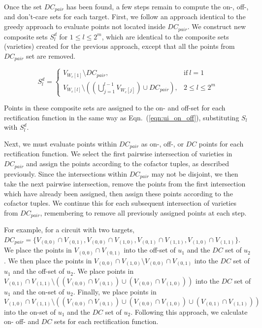 Once the set $DC_{pair}$ has been found, a few steps remain to compute the on-, off-, and don't-care sets for each target. First, we follow an approach identical to the greedy approach to evaluate points not located inside $DC_{pair}$. We construct new composite sets $S_l^d$ for $1 \leq l \leq 2^m$, which are identical to the composite sets (varieties) created for the previous approach, except that all the points from $DC_{pair}$ set are removed.

\begin{equation}
  \label{eqn:composite_dc}
  S_l^d=
  \begin{cases}
    V_{W_c[1]} \setminus DC_{pair},                                                & \text{if}\ l=1   \\
    V_{W_c[l]} \setminus ((\bigcup\limits_{j=1}^{l-1}V_{W_c[j]}) \cup DC_{pair}), & 2\leq l \leq 2^m
  \end{cases}
\end{equation}

Points in these composite sets are assigned to the on- and off-set for each rectification function in the same way as 
Eqn.~(\ref{eqn:ui_on_off}), substituting $S_l$ with $S_l^d$.

Next, we must evaluate points within $DC_{pair}$ as on-, off-, or $DC$ points for each rectification function. We select the first pairwise intersection of varieties in $DC_{pair}$ and assign the points according to the cofactor tuples, as described previously. Since the intersections within $DC_{pair}$ may not be disjoint, we then take the next pairwise intersection, remove the points from the first intersection which have already been assigned, then assign these points according to the cofactor tuples. We continue this for each subsequent intersection of varieties from $DC_{pair}$, remembering to remove all previously assigned points at each step.

For example, for a circuit with two targets, $DC_{pair} = \{V_{(0,0)} \cap V_{(0,1)}, V_{(0,0)} \cap V_{(1,0)}, V_{(0,1)} \cap V_{(1,1)}, V_{(1,0)} \cap V_{(1,1)}\}$. We place the points in $V_{(0,0)} \cap V_{(0,1)}$ into the off-set of $u_1$ and the $DC$ set of $u_2$. We then place the points in $V_{(0,0)} \cap V_{(1,0)} \setminus V_{(0,0)} \cap V_{(0,1)}$ into the $DC$ set of $u_1$ and the off-set of $u_2$. We place points in $V_{(0,1)} \cap V_{(1,1)} \setminus ((V_{(0,0)} \cap V_{(0,1)}) \cup (V_{(0,0)} \cap V_{(1,0)}))$ into the $DC$ set of $u_1$ and the on-set of $u_2$. Finally, we place points in $V_{(1,0)} \cap V_{(1,1)} \setminus ((V_{(0,0)} \cap V_{(0,1)}) \cup (V_{(0,0)} \cap V_{(1,0)}) \cup (V_{(0,1)} \cap V_{(1,1)}))$ into the on-set of $u_1$ and the $DC$ set of $u_2$. 
Following this approach, we calculate on- off- and $DC$ sets for each rectification function. 


